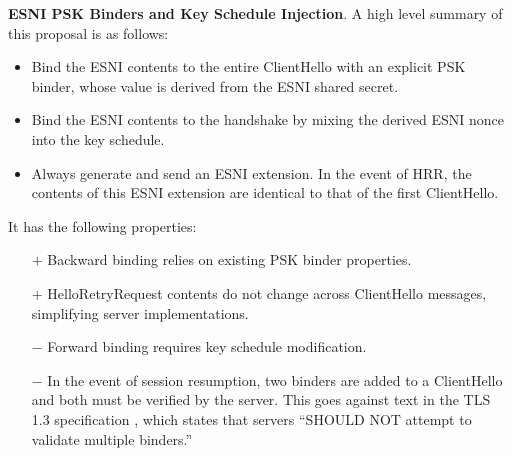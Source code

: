\documentclass[twoside]{article}
\theoremstyle{definition}
\begin{document}
\textbf{ESNI PSK Binders and Key Schedule Injection}. A high level summary of this proposal is as follows:
%
\begin{itemize}
  \item Bind the ESNI contents to the entire ClientHello with an explicit PSK binder, whose value is
  derived from the ESNI shared secret.
  \item Bind the ESNI contents to the handshake by mixing the derived ESNI nonce into the key schedule.
  \item Always generate and send an ESNI extension. In the event of HRR, the contents of this ESNI 
  extension are identical to that of the first ClientHello.
\end{itemize}
%
It has the following properties:
%
\begin{itemize}
  \item[$+$] Backward binding relies on existing PSK binder properties.
  \item[$+$] HelloRetryRequest contents do not change across ClientHello messages, simplifying server
  implementations.
  \item[$-$] Forward binding requires key schedule modification.
  \item[$-$] In the event of session resumption, two binders are added to a ClientHello and both
  must be verified by the server. This goes against text in the TLS 1.3 specification \cite{rfc8446}, 
  which states that servers ``SHOULD NOT attempt to validate multiple binders.''
\end{itemize}
%



\end{document}
